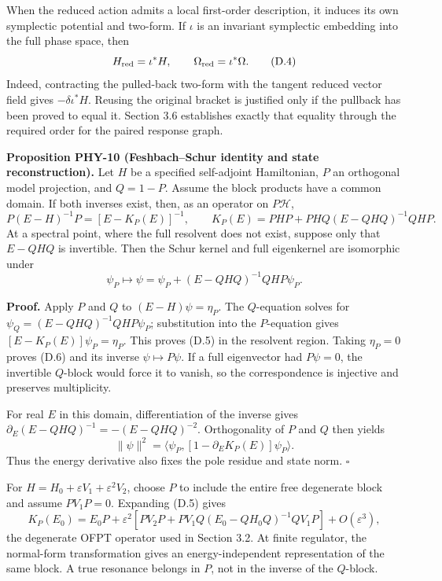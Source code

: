\documentclass[a4paper,11pt]{article}
\numberwithin{equation}{section}
\begin{document}
When the reduced action admits a local first-order description, it induces its own symplectic potential and two-form. If \(\iota\) is an invariant symplectic embedding into the full phase space, then \[
H_{\rm red}=\iota^*H,\qquad \Omega_{\rm red}=\iota^*\Omega.
\tag{D.4}
\] Indeed, contracting the pulled-back two-form with the tangent reduced vector field gives \(-\delta\iota^*H\). Reusing the original bracket is justified only if the pullback has been proved to equal it. Section 3.6 establishes exactly that equality through the required order for the paired response graph.

\textbf{Proposition PHY-10 (Feshbach--Schur identity and state reconstruction).} Let \(H\) be a specified self-adjoint Hamiltonian, \(P\) an orthogonal model projection, and \(Q=1-P\). Assume the block products have a common domain. If both inverses exist, then, as an operator on \(P\mathcal H\), \[
P(E-H)^{-1}P=[E-K_P(E)]^{-1},
\qquad
K_P(E)=PHP+PHQ(E-QHQ)^{-1}QHP.
\tag{D.5}
\] At a spectral point, where the full resolvent does not exist, suppose only that \(E-QHQ\) is invertible. Then the Schur kernel and full eigenkernel are isomorphic under \[
\psi_P\longmapsto
\psi=\psi_P+(E-QHQ)^{-1}QHP\psi_P.
\tag{D.6}
\]

\textbf{Proof.} Apply \(P\) and \(Q\) to \((E-H)\psi=\eta_P\). The \(Q\)-equation solves for \(\psi_Q=(E-QHQ)^{-1}QHP\psi_P\); substitution into the \(P\)-equation gives \([E-K_P(E)]\psi_P=\eta_P\). This proves (D.5) in the resolvent region. Taking \(\eta_P=0\) proves (D.6) and its inverse \(\psi\mapsto P\psi\). If a full eigenvector had \(P\psi=0\), the invertible \(Q\)-block would force it to vanish, so the correspondence is injective and preserves multiplicity.

For real \(E\) in this domain, differentiation of the inverse gives \(\partial_E(E-QHQ)^{-1}=-(E-QHQ)^{-2}\). Orthogonality of \(P\) and \(Q\) then yields \[
\|\psi\|^2
=\langle\psi_P,[1-\partial_EK_P(E)]\psi_P\rangle.
\tag{D.7}
\] Thus the energy derivative also fixes the pole residue and state norm. \(\square\)

For \(H=H_0+\varepsilon V_1+\varepsilon^2V_2\), choose \(P\) to include the entire free degenerate block and assume \(PV_1P=0\). Expanding (D.5) gives \[
K_P(E_0)=E_0P+\varepsilon^2
\left[PV_2P+PV_1Q(E_0-QH_0Q)^{-1}QV_1P\right]
+O(\varepsilon^3),
\tag{D.8}
\] the degenerate OFPT operator used in Section 3.2. At finite regulator, the normal-form transformation gives an energy-independent representation of the same block. A true resonance belongs in \(P\), not in the inverse of the \(Q\)-block.
\end{document}
